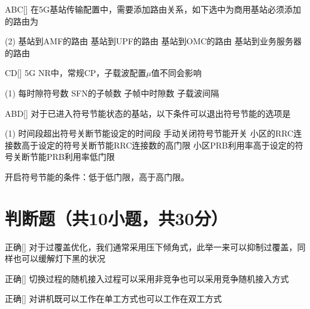 \begin{choice}{\;ABC\;}[]
    在5G基站传输配置中，需要添加路由关系，如下选中为商用基站必须添加的路由为
    \begin{tasks}(2)
        \task 基站到AMF的路由
        \task 基站到UPF的路由
        \task 基站到OMC的路由
        \task 基站到业务服务器的路由
    \end{tasks}
\end{choice}

\begin{choice}{\;CD\;}[]
    5G NR中，常规CP，子载波配置$μ$值不同会影响
    \begin{tasks}(1)
        \task 每时隙符号数
        \task SFN的子帧数
        \task 子帧中时隙数
        \task 子载波间隔
    \end{tasks}
\end{choice}

\begin{choice}{\;ABD\;}[]
    对于已进入符号节能状态的基站，以下条件可以退出符号节能的选项是
    \begin{tasks}(1)
        \task 时间段超出符号关断节能设定的时间段
        \task 手动关闭符号节能开关
        \task 小区的RRC连接数高于设定的符号关断节能RRC连接数的高门限
        \task 小区PRB利用率高于设定的符号关断节能PRB利用率低门限
    \end{tasks}
\end{choice}

\begin{solution}
    开启符号节能的条件：低于低门限，高于高门限。

\end{solution}


\section{判断题（共10小题，共30分）}

\begin{choice}{\;正确\;}[]
    对于过覆盖优化，我们通常采用压下倾角式，此举一来可以抑制过覆盖，同样也可以缓解灯下黑的状况
\end{choice}


\begin{choice}{\;正确\;}[]
    切换过程的随机接入过程可以采用非竞争也可以采用竞争随机接入方式
\end{choice}

\begin{choice}{\;正确\;}[]
    对讲机既可以工作在单工方式也可以工作在双工方式
\end{choice}

